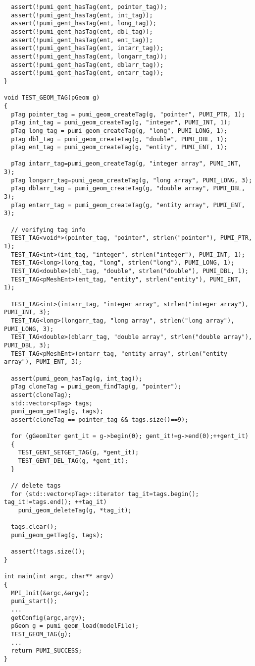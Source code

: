 \begin{small}
\begin{verbatim}
  assert(!pumi_gent_hasTag(ent, pointer_tag));
  assert(!pumi_gent_hasTag(ent, int_tag));
  assert(!pumi_gent_hasTag(ent, long_tag));
  assert(!pumi_gent_hasTag(ent, dbl_tag));
  assert(!pumi_gent_hasTag(ent, ent_tag));
  assert(!pumi_gent_hasTag(ent, intarr_tag));
  assert(!pumi_gent_hasTag(ent, longarr_tag));
  assert(!pumi_gent_hasTag(ent, dblarr_tag));
  assert(!pumi_gent_hasTag(ent, entarr_tag));
}

void TEST_GEOM_TAG(pGeom g)
{
  pTag pointer_tag = pumi_geom_createTag(g, "pointer", PUMI_PTR, 1);
  pTag int_tag = pumi_geom_createTag(g, "integer", PUMI_INT, 1);
  pTag long_tag = pumi_geom_createTag(g, "long", PUMI_LONG, 1);
  pTag dbl_tag = pumi_geom_createTag(g, "double", PUMI_DBL, 1);
  pTag ent_tag = pumi_geom_createTag(g, "entity", PUMI_ENT, 1);

  pTag intarr_tag=pumi_geom_createTag(g, "integer array", PUMI_INT, 3);
  pTag longarr_tag=pumi_geom_createTag(g, "long array", PUMI_LONG, 3);
  pTag dblarr_tag = pumi_geom_createTag(g, "double array", PUMI_DBL, 3);
  pTag entarr_tag = pumi_geom_createTag(g, "entity array", PUMI_ENT, 3);

  // verifying tag info
  TEST_TAG<void*>(pointer_tag, "pointer", strlen("pointer"), PUMI_PTR, 1);
  TEST_TAG<int>(int_tag, "integer", strlen("integer"), PUMI_INT, 1);
  TEST_TAG<long>(long_tag, "long", strlen("long"), PUMI_LONG, 1);
  TEST_TAG<double>(dbl_tag, "double", strlen("double"), PUMI_DBL, 1);
  TEST_TAG<pMeshEnt>(ent_tag, "entity", strlen("entity"), PUMI_ENT, 1);

  TEST_TAG<int>(intarr_tag, "integer array", strlen("integer array"), PUMI_INT, 3);
  TEST_TAG<long>(longarr_tag, "long array", strlen("long array"), PUMI_LONG, 3);
  TEST_TAG<double>(dblarr_tag, "double array", strlen("double array"), PUMI_DBL, 3);
  TEST_TAG<pMeshEnt>(entarr_tag, "entity array", strlen("entity array"), PUMI_ENT, 3);

  assert(pumi_geom_hasTag(g, int_tag));
  pTag cloneTag = pumi_geom_findTag(g, "pointer");
  assert(cloneTag);
  std::vector<pTag> tags;
  pumi_geom_getTag(g, tags);
  assert(cloneTag == pointer_tag && tags.size()==9);

  for (gGeomIter gent_it = g->begin(0); gent_it!=g->end(0);++gent_it)
  {
    TEST_GENT_SETGET_TAG(g, *gent_it);
    TEST_GENT_DEL_TAG(g, *gent_it);
  }

  // delete tags
  for (std::vector<pTag>::iterator tag_it=tags.begin(); tag_it!=tags.end(); ++tag_it)
    pumi_geom_deleteTag(g, *tag_it);

  tags.clear();
  pumi_geom_getTag(g, tags);

  assert(!tags.size());
}

int main(int argc, char** argv)
{
  MPI_Init(&argc,&argv);
  pumi_start();
  ...
  getConfig(argc,argv);
  pGeom g = pumi_geom_load(modelFile);
  TEST_GEOM_TAG(g);
  ...  
  return PUMI_SUCCESS;
}
\end{verbatim}
\end{small}

